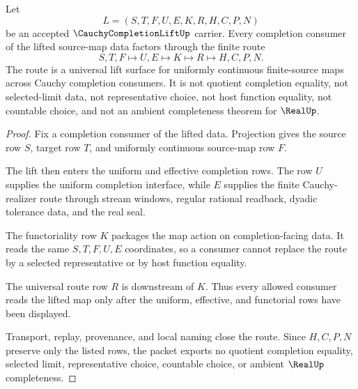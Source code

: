 \begin{theorem}
\label{thm:cauchy-completion-lift-universal-route}
Let
$$
L=(S,T,F,U,E,K,R,H,C,P,N)
$$
be an accepted $\CauchyCompletionLiftUp$ carrier. Every completion consumer of the lifted source-map data factors through the finite route
$$
S,T,F \longmapsto U,E \longmapsto K \longmapsto R \longmapsto H,C,P,N .
$$
The route is a universal lift surface for uniformly continuous finite-source maps across Cauchy completion consumers. It is not quotient completion equality, not selected-limit data, not representative choice, not host function equality, not countable choice, and not an ambient completeness theorem for $\RealUp$.
\end{theorem}
\begin{proof}
Fix a completion consumer of the lifted data. Projection gives the source row $S$, target row $T$, and uniformly continuous source-map row $F$.

The lift then enters the uniform and effective completion rows. The row $U$ supplies the uniform completion interface, while $E$ supplies the finite Cauchy-realizer route through stream windows, regular rational readback, dyadic tolerance data, and the real seal.

The functoriality row $K$ packages the map action on completion-facing data. It reads the same $S,T,F,U,E$ coordinates, so a consumer cannot replace the route by a selected representative or by host function equality.

The universal route row $R$ is downstream of $K$. Thus every allowed consumer reads the lifted map only after the uniform, effective, and functorial rows have been displayed.

Transport, replay, provenance, and local naming close the route. Since $H,C,P,N$ preserve only the listed rows, the packet exports no quotient completion equality, selected limit, representative choice, countable choice, or ambient $\RealUp$ completeness.
\end{proof}

